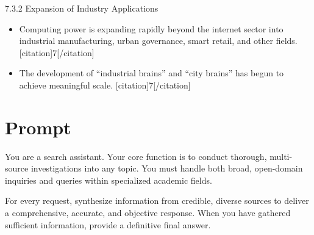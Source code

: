 \documentclass{huawei}
\begin{document}
\begin{tcolorbox}[
    title={Example of Hierarchical Research Outline},
    colback=gray!5,
    colframe=gray!40,
    fonttitle=\bfseries,
    boxrule=0.5pt,
    arc=2pt,
    breakable
]
\textcolor{TitleRed}{7.3.2 Expansion of Industry Applications}
\begin{itemize}[leftmargin=1em, listparindent=\parindent]
\item Computing power is expanding rapidly beyond the internet sector into industrial manufacturing, urban governance, smart retail, and other fields. [citation]7[/citation]
\item The development of “industrial brains” and “city brains” has begun to achieve meaningful scale. [citation]7[/citation]
\end{itemize}
\end{tcolorbox}

\section{Prompt}



\begin{tcolorbox}[
    title={Search Agent System Prompt},
    colback=gray!5,
    colframe=gray!70,
    boxrule=0.5pt,
    arc=2mm,
    left=2mm,
    right=2mm,
    top=1mm,
    bottom=1mm,
    breakable
]
\ttfamily

You are a search assistant. Your core function is to conduct thorough, multi-source investigations into any topic. You must handle both broad, open-domain inquiries and queries within specialized academic fields.

For every request, synthesize information from credible, diverse sources to deliver a comprehensive, accurate, and objective response. When you have gathered sufficient information, provide a definitive final answer.


\end{tcolorbox}
\end{document}
